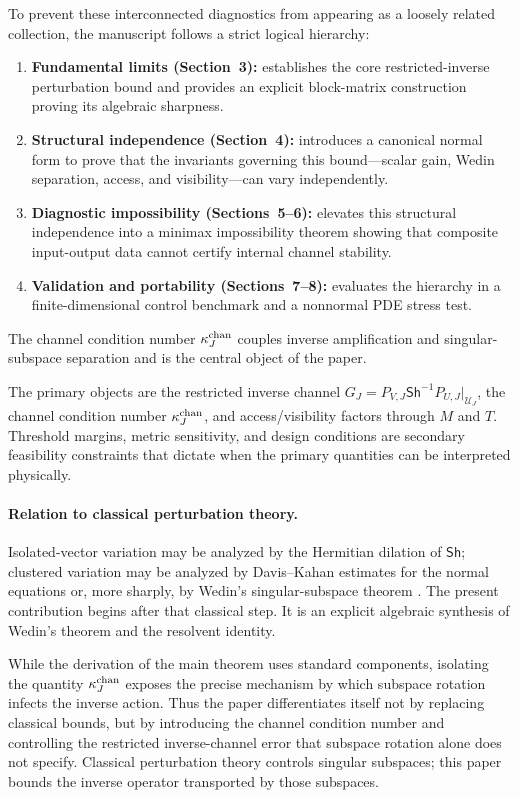 \documentclass[review]{siamart220329}
\theoremstyle{definition}
\theoremstyle{remark}
\newcommand{\calU}{\mathcal{U}}
\newcommand{\Sh}{\mathsf{Sh}}
\begin{document}
To prevent these interconnected diagnostics from appearing as a loosely related
collection, the manuscript follows a strict logical hierarchy:
\begin{enumerate}
    \item \textbf{Fundamental limits (Section~3):} establishes the core
    restricted-inverse perturbation bound and provides an explicit block-matrix
    construction proving its algebraic sharpness.
    \item \textbf{Structural independence (Section~4):} introduces a canonical
    normal form to prove that the invariants governing this bound---scalar gain,
    Wedin separation, access, and visibility---can vary independently.
    \item \textbf{Diagnostic impossibility (Sections~5--6):} elevates this
    structural independence into a minimax impossibility theorem showing that
    composite input-output data cannot certify internal channel stability.
    \item \textbf{Validation and portability (Sections~7--8):} evaluates the
    hierarchy in a finite-dimensional control benchmark and a nonnormal PDE
    stress test.
\end{enumerate}
The channel condition number $\kappa_J^{\rm chan}$ couples inverse amplification and singular-subspace separation and is the central object of the paper.

The primary objects are the restricted inverse channel $G_J=P_{V,J}\Sh^{-1}P_{U,J}|_{\calU_J}$, the channel condition number $\kappa_J^{\rm chan}$, and access/visibility factors through $M$ and $T$. Threshold margins, metric sensitivity, and design conditions are secondary feasibility constraints that dictate when the primary quantities can be interpreted physically.

\paragraph{Relation to classical perturbation theory.}
Isolated-vector variation may be analyzed by the Hermitian dilation of $\Sh$; clustered variation may be analyzed by Davis--Kahan estimates for the normal equations or, more sharply, by Wedin's singular-subspace theorem \cite{DavisKahan1970,Wedin1972,StewartSun1990,Kato1995}. The present contribution begins after that classical step. It is an explicit algebraic synthesis of Wedin's theorem and the resolvent identity. 

While the derivation of the main theorem uses standard components, isolating the quantity $\kappa_J^{\rm chan}$ exposes the precise mechanism by which subspace rotation infects the inverse action. Thus the paper differentiates itself not by replacing classical bounds, but by introducing the channel condition number and controlling the restricted inverse-channel error that subspace rotation alone does not specify. Classical perturbation theory controls singular subspaces; this paper bounds the inverse operator transported by those subspaces.
\end{document}
